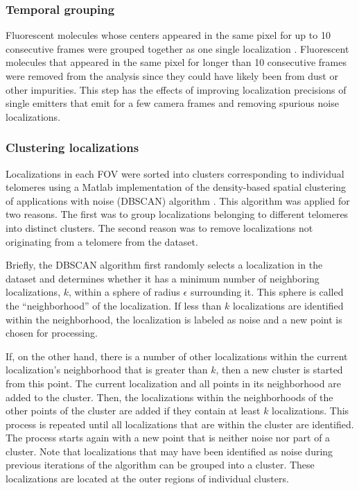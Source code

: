 \documentclass[12pt, a4paper]{article}
\begin{document}
\subsubsection{Temporal grouping}
\label{sec-1-2-1}
Fluorescent molecules whose centers appeared in the same pixel for
up to 10 consecutive frames were grouped together as one single
localization \cite{annibale-natmethods-2011}. Fluorescent
molecules that appeared in the same pixel for longer than 10
consecutive frames were removed from the analysis since they could
have likely been from dust or other impurities. This step has the
effects of improving localization precisions of single emitters
that emit for a few camera frames and removing spurious noise
localizations.

\subsubsection{Clustering localizations}
\label{sec-1-2-2}
Localizations in each FOV were sorted into clusters corresponding
to individual telomeres using a Matlab implementation of the
density-based spatial clustering of applications with noise
(DBSCAN) algorithm
\cite{daszykowski-chemometrintelllab-2001}. This algorithm was
applied for two reasons. The first was to group localizations
belonging to different telomeres into distinct clusters. The
second reason was to remove localizations not originating from a
telomere from the dataset.

Briefly, the DBSCAN algorithm first randomly selects a
localization in the dataset and determines whether it has a
minimum number of neighboring localizations, $k$, within a sphere
of radius $\epsilon$ surrounding it. This sphere is called the
``neighborhood'' of the localization. If less than $k$
localizations are identified within the neighborhood, the
localization is labeled as noise and a new point is chosen for
processing.

If, on the other hand, there is a number of other localizations
within the current localization's neighborhood that is greater
than $k$, then a new cluster is started from this point. The
current localization and all points in its neighborhood are added
to the cluster. Then, the localizations within the neighborhoods
of the other points of the cluster are added if they contain at
least $k$ localizations. This process is repeated until all
localizations that are within the cluster are identified. The
process starts again with a new point that is neither noise nor
part of a cluster. Note that localizations that may have been
identified as noise during previous iterations of the algorithm
can be grouped into a cluster. These localizations are located at
the outer regions of individual clusters.
\end{document}
